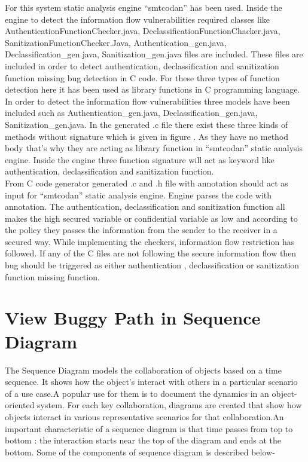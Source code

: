 For this system static analysis engine \enquote{smtcodan}  has been used. Inside the engine to detect the information flow vulnerabilities required classes like AuthenticationFunctionChecker.java, DeclassificationFunctionChacker.java, SanitizationFunctionChecker.Java, Authentication\_gen.java,\\
Declassification\_gen.java,
Sanitization\_gen.java files are included. These files are included in order to detect authentication, declassification and sanitization function missing bug detection in C code. For these three types of function detection here it has been used as library functions in C programming language. In order to detect the information flow vulnerabilities three models have been included such as Authentication\_gen.java,
Declassification\_gen.java,
Sanitization\_gen.java. In the generated .c file there exist these three kinds of methods without signature which is given in figure . As they have no method body that's why they are acting as library function in \enquote{smtcodan} static analysis engine. Inside the engine three function signature will act as keyword like authentication, declassification and sanitization function. \\

From C code generator generated .c and .h file with annotation should act as input for \enquote{smtcodan} static analysis engine. Engine parses the code with annotation. The authentication, declassification and sanitization function all makes the high secured variable or confidential variable as low and according to the policy they passes the information from the sender to the receiver in a secured way. While implementing the checkers, information flow restriction has followed. If any of the C files are not following the secure information flow then bug should be triggered as either authentication , declassification or sanitization function missing function.

\section{View Buggy Path in Sequence Diagram}

The Sequence Diagram models the collaboration of objects based on a time sequence. It shows how the object's interact with others in a particular scenario of a use case.A popular use for them is to document the dynamics in an object-oriented system. For each key collaboration, diagrams are created that show how objects interact in various representative scenarios for that collaboration.An important characteristic of a sequence diagram is that time passes from top to bottom : the interaction starts near the top of the diagram and ends at the bottom. Some of the components of sequence diagram \cite{ref_107_visual-paradigm:visual-paradigm} is described below-


